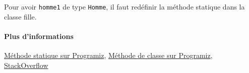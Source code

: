 Pour avoir \texttt{homme1} de type \texttt{Homme}, il faut redéfinir la méthode statique dans la classe fille.

\paragraph{Plus d'informations} \href{https://www.programiz.com/python-programming/methods/built-in/staticmethod}{Méthode statique sur Programiz}, \href{https://www.programiz.com/python-programming/methods/built-in/classmethod}{Méthode de classe sur Programiz}, \href{https://stackoverflow.com/questions/136097/what-is-the-difference-between-staticmethod-and-classmethod-in-python/1669524#1669524}{StackOverflow}
